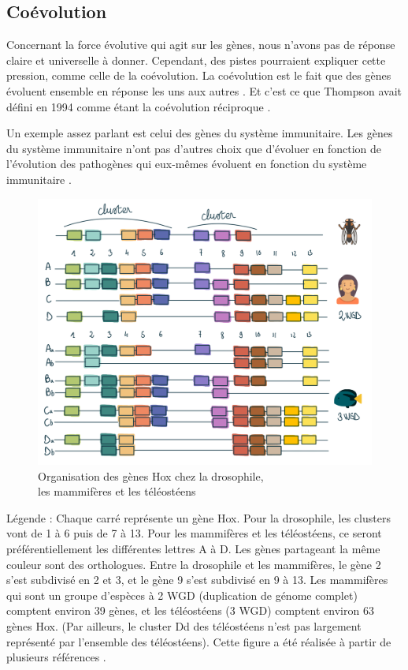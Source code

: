 \subsection{Coévolution}\label{coevo}
\par Concernant la force évolutive qui agit sur les gènes, nous n’avons pas de réponse claire et universelle à donner. Cependant, des pistes pourraient expliquer cette pression, comme celle de la coévolution. La coévolution est le fait que des gènes évoluent ensemble en réponse les uns aux autres \parencite{lovell_integrated_2010}. Et c'est ce que Thompson avait défini en 1994 comme étant la coévolution réciproque \parencite{thompson_coevolutionary_1994}. 
\par Un exemple assez parlant est celui des gènes du système immunitaire. Les gènes du système immunitaire n’ont pas d’autres choix que d’évoluer en fonction de l’évolution des pathogènes qui eux-mêmes évoluent en fonction du système immunitaire \parencite{schlesinger_coevolutionary_2014}. 

\begin{figure}[H]
    \centering
    \includegraphics[width=1\textwidth]{figures/corps/figure3.png}
    \caption{Organisation des gènes Hox chez la drosophile,\\ les mammifères et les téléostéens}
    \label{fig:3_hox}
\end{figure}
Légende : Chaque carré représente un gène Hox. Pour la drosophile, les clusters vont de 1 à 6 puis de 7 à 13. Pour les mammifères et les téléostéens, ce seront préférentiellement les différentes lettres A à D. Les gènes partageant la même couleur sont des orthologues. 
Entre la drosophile et les mammifères, le gène 2 s’est subdivisé en 2 et 3, et le gène 9 s’est subdivisé en 9 à 13. Les mammifères qui sont un groupe d’espèces à 2 WGD (duplication de génome complet) comptent environ 39 gènes, et les téléostéens (3 WGD) comptent environ 63 gènes Hox. (Par ailleurs, le cluster Dd des téléostéens n’est pas largement représenté par l’ensemble des téléostéens). Cette figure a été réalisée à partir de plusieurs références \cite{amores_zebrafish_1998, guo_hox_2010, lappin_hox_2006, rux_hox_2017}.

